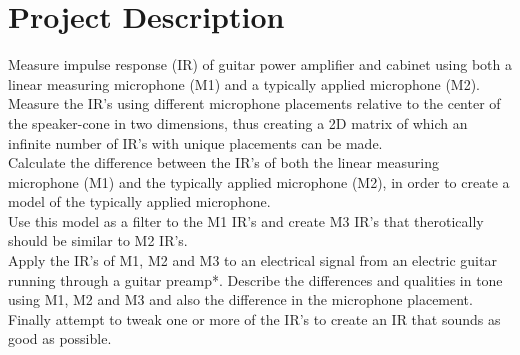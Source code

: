 \chapter{Project Description}
Measure impulse response (IR) of guitar power amplifier and cabinet using both a linear measuring microphone (M1) and a typically applied microphone (M2). Measure the IR’s using different microphone placements relative to the center of the speaker-cone in two dimensions, thus creating a 2D matrix of which an infinite number of IR’s with unique placements can be made. \\
Calculate the difference between the IR’s of both the linear measuring microphone (M1) and the typically applied microphone (M2), in order to create a model of the typically applied microphone. \\
Use this model as a filter to the M1 IR’s and create M3 IR’s that therotically should be similar to M2 IR’s. \\
Apply the IR’s of M1, M2 and M3 to an electrical signal from an electric guitar running through a guitar preamp*. Describe the differences and qualities in tone using M1, M2 and M3 and also the difference in the microphone placement. \\
Finally attempt to tweak one or more of the IR’s to create an IR that sounds as good as possible.